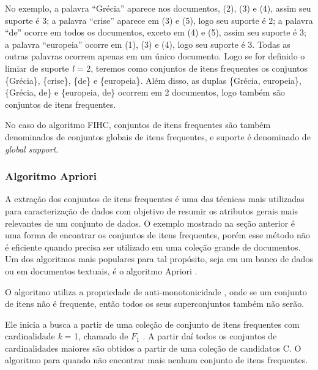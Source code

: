 \documentclass[a4paper,12pt]{article}
\begin{document}
No exemplo, a palavra “Grécia” aparece nos documentos, (2), (3) e (4), assim seu suporte é 3; a palavra “crise” aparece em (3) e (5), logo seu suporte é 2; a palavra “de” ocorre em todos os documentos, exceto em (4) e (5), assim seu suporte é 3; a palavra “europeia” ocorre em (1), (3) e (4), logo seu suporte é 3. Todas as outras palavras ocorrem apenas em um único documento. Logo se for definido o limiar de suporte \emph{l} = 2, teremos como conjuntos de itens frequentes os conjuntos \{Grécia\}, \{crise\}, \{de\} e \{europeia\}. Além disso, as duplas \{Grécia, europeia\}, \{Grécia, de\} e \{europeia, de\} ocorrem em 2 documentos, logo também são conjuntos de itens frequentes.

No caso do algoritmo FIHC, conjuntos de itens frequentes são também denominados de conjuntos globais de itens frequentes, e suporte é denominado de \textit{global support}.

\subsubsection {Algoritmo Apriori}
\label {sec:algoritmo_apriori}

A extração dos conjuntos de itens frequentes é uma das técnicas mais utilizadas para caracterização de dados com objetivo de resumir os atributos gerais mais relevantes de um conjunto de dados. O exemplo mostrado na seção anterior é uma forma de encontrar os conjuntos de itens frequentes, porém esse método não é eficiente quando precisa ser utilizado em uma coleção grande de documentos. Um dos algoritmos mais populares para tal propósito, seja em um banco de dados ou em documentos textuais, é o algoritmo Apriori \cite{Agrawal94}.

O algoritmo utiliza a propriedade de anti-monotonicidade \cite{Rajaraman11}, onde se um conjunto de itens não é frequente, então todos os seus superconjuntos também não serão.

Ele inicia a busca a partir de uma coleção de conjunto de itens frequentes com cardinalidade \emph{k} = 1, chamado de $F_{1}$ . A partir daí todos os conjuntos de cardinalidades maiores são obtidos a partir de uma coleção de candidatos C. O algoritmo para quando não encontrar mais nenhum conjunto de itens frequentes. %
\end{document}
